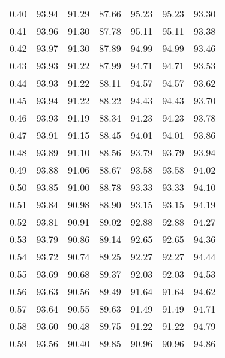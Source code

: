 \begin{tabular}{|c|c|c|c|c|c|c|}
      0.40 &     93.94 &     91.29 &      87.66 &   95.23 &      95.23 &         93.30 \\
      0.41 &     93.96 &     91.30 &      87.78 &   95.11 &      95.11 &         93.38 \\
      0.42 &     93.97 &     91.30 &      87.89 &   94.99 &      94.99 &         93.46 \\
      0.43 &     93.93 &     91.22 &      87.99 &   94.71 &      94.71 &         93.53 \\
      0.44 &     93.93 &     91.22 &      88.11 &   94.57 &      94.57 &         93.62 \\
      0.45 &     93.94 &     91.22 &      88.22 &   94.43 &      94.43 &         93.70 \\
      0.46 &     93.93 &     91.19 &      88.34 &   94.23 &      94.23 &         93.78 \\
      0.47 &     93.91 &     91.15 &      88.45 &   94.01 &      94.01 &         93.86 \\
      0.48 &     93.89 &     91.10 &      88.56 &   93.79 &      93.79 &         93.94 \\
      0.49 &     93.88 &     91.06 &      88.67 &   93.58 &      93.58 &         94.02 \\
      0.50 &     93.85 &     91.00 &      88.78 &   93.33 &      93.33 &         94.10 \\
      0.51 &     93.84 &     90.98 &      88.90 &   93.15 &      93.15 &         94.19 \\
      0.52 &     93.81 &     90.91 &      89.02 &   92.88 &      92.88 &         94.27 \\
      0.53 &     93.79 &     90.86 &      89.14 &   92.65 &      92.65 &         94.36 \\
      0.54 &     93.72 &     90.74 &      89.25 &   92.27 &      92.27 &         94.44 \\
      0.55 &     93.69 &     90.68 &      89.37 &   92.03 &      92.03 &         94.53 \\
      0.56 &     93.63 &     90.56 &      89.49 &   91.64 &      91.64 &         94.62 \\
      0.57 &     93.64 &     90.55 &      89.63 &   91.49 &      91.49 &         94.71 \\
      0.58 &     93.60 &     90.48 &      89.75 &   91.22 &      91.22 &         94.79 \\
      0.59 &     93.56 &     90.40 &      89.85 &   90.96 &      90.96 &         94.86 \\

\end{tabular}
